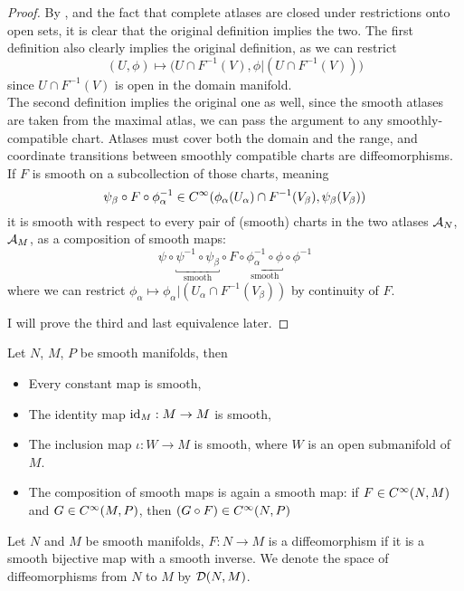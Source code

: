 \documentclass[../main-manifolds.tex]{subfiles}
\begin{document}
\begin{proof}
    By , and the fact that complete atlases are closed under restrictions onto open sets, it is clear that the original definition implies the two. The first definition also clearly implies the original definition, as we can restrict 
    \[(U,\phi)\mapsto \biggl(U\cap F^{-1}(V),\phi|(U\cap F^{-1}(V))\biggr)\]
    since $U\cap F^{-1}(V)$ is open in the domain manifold.\\

    The second definition implies the original one as well, since the smooth atlases are taken from the maximal atlas, we can pass the argument to any smoothly-compatible chart. Atlases must cover both the domain and the range, and coordinate transitions between smoothly compatible charts are diffeomorphisms. If $F$ is smooth on a subcollection of those charts, meaning
    \[
        \psi_\beta\circ F\circ\phi_\alpha^{-1}\in \cinf[\phi_\alpha(U_\alpha)\cap F^{-1}(V_\beta),\psi_\beta(V_\beta)]
    \]
    it is smooth with respect to every pair of (smooth) charts in the two atlases $\mathcal{A}_{N}$, $\mathcal{A}_{M}$, as a composition of smooth maps:
    \[
        \psi\circ \underbracket{\psi^{-1}\circ \psi_\beta}_{\text{smooth}}\circ F\circ\underbracket{\phi_\alpha^{-1}\circ \phi}_{\text{smooth}}\circ\phi^{-1}
    \]
    where we can restrict $\phi_\alpha\mapsto \phi_\alpha|(U_\alpha\cap F^{-1}(V_\beta))$ by continuity of $F$.

    I will prove the third and last equivalence later.
\end{proof}
\begin{wts}\label{lee-chp2:sources-of-smooth-maps}
    Let $N$, $M$, $P$ be smooth manifolds, then
    \begin{itemize}
        \item Every constant map is smooth,
        \item The identity map $\operatorname{id}_{M}:M\to M$ is smooth,
        \item The inclusion map $\iota: W\to M$ is smooth, where $W$ is an open submanifold of $M$.
        \item The composition of smooth maps is again a smooth map: if $F\in \cinf[N,M]$ and $G\in \cinf[M,P]$, then $(G\circ F)\in\cinf[N,P]$
    \end{itemize}
\end{wts}

\begin{definition}\label{lee-chp2:diffeomorphism-definition}
    Let $N$ and $M$ be smooth manifolds, $F:N\to M$ is a diffeomorphism if it is a smooth bijective map with a smooth inverse. We denote the space of diffeomorphisms from $N$ to $M$ by $\diffeo[N,M]$.
\end{definition}
\end{document}
